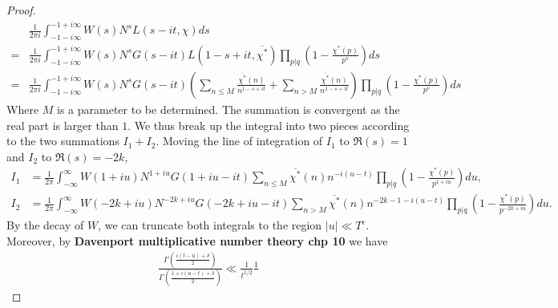 \begin{proof}
\begin{align*}
   &\frac{1}{2\pi i}\int_{-1-i\infty}^{-1+i\infty}W(s)N^sL(s-it,\chi) ds \\=&\frac{1}{2\pi i}
   \int_{-1-i\infty}^{-1+i\infty}W(s)N^s
    G(s-it) L(1-s+it,\overline{\chi^*}) \prod_{p|q} \left(1-\frac{\chi^*(p)}{p^s}\right)ds\\
    =& \frac{1}{2\pi i}\int_{-1-i\infty}^{-1+i\infty}W(s)N^s
    G(s-it) 
    \left(\sum_{n\leq M}\frac{\overline{\chi^*}(n)}{n^{1-s+it}}+
    \sum_{n> M}\frac{\overline{\chi^*}(n)}{n^{1-s+it}}
   \right) \prod_{p|q} \left(1-\frac{\chi^*(p)}{p^s}\right)ds
\end{align*}
Where $M$ is a parameter to be determined. The summation is convergent as the real part is larger than $1$.
We thus break up the integral into two pieces according to the two summations $I_1+I_2$. Moving the line of integration of $I_1$ to $\Re(s)=1$ and $I_2$ to $\Re(s)=-2k$,
\begin{align*}
        I_1&= \frac{1}{2\pi}\int_{-\infty}^{\infty}W(1+iu)N^{1+iu}G(1+iu-it)\sum_{n\leq M}\overline{\chi^*}(n)n^{-i(u-t)}\prod_{p|q} \left(1-\frac{\chi^*(p)}{p^{1+iu}}\right)du,\\
        I_2&= \frac{1}{2\pi}\int_{-\infty}^{\infty}W(-2k+iu)N^{-2k+iu}G(-2k+iu-it)\sum_{n> M}\overline{\chi^*}(n)n^{-2k-1-i(u-t)}\prod_{p|q} \left(1-\frac{\chi^*(p)}{p^{-2k+iu}}\right)du.
\end{align*}
By the decay of $W$, we can truncate both integrals to the region $|u|\ll T^\epsilon$.
Moreover, by \textbf{Davenport multiplicative number theory chp 10}
we have \begin{align*}
    \frac{\Gamma\left(\frac{i(t-u)+\delta}{2}\right)}{\Gamma\left(\frac{1+i(u-t)+\delta}{2}\right)}\ll \frac{1}{t^{1/2}} \frac{1}{}
\end{align*}
\end{proof}